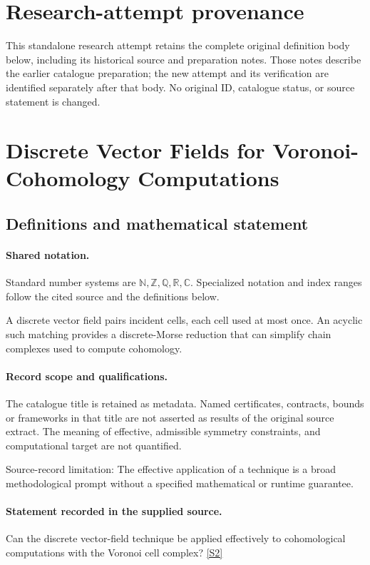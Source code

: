 \documentclass[11pt]{article}
\begin{document}
\section*{Research-attempt provenance}
This standalone research attempt retains the complete original definition body below,
including its historical source and preparation notes. Those notes describe the
earlier catalogue preparation; the new attempt and its verification are identified
separately after that body. No original ID, catalogue status, or source statement is changed.

\section{Discrete Vector Fields for Voronoi-Cohomology Computations}\label{statement}

\subsection{Definitions and mathematical statement}

\paragraph{Shared notation.}Standard number systems are $\mathbb N,\mathbb Z,\mathbb Q,\mathbb R,\mathbb C$. Specialized notation and index ranges follow the cited source and the definitions below.


A discrete vector field pairs incident cells, each cell used at most once. An acyclic such matching provides a discrete-Morse reduction that can simplify chain complexes used to compute cohomology.
\paragraph{Record scope and qualifications.}
The catalogue title is retained as metadata. Named certificates, contracts, bounds or frameworks in that title are not asserted as results of the original source extract.
The meaning of effective, admissible symmetry constraints, and computational target are not quantified.

Source-record limitation: The effective application of a technique is a broad methodological prompt without a specified mathematical or runtime guarantee.
\paragraph{Statement recorded in the supplied source.}
Can the discrete vector-field technique be applied effectively to cohomological computations with the Voronoi cell complex? \href{https://doi.org/10.4171/owr/2016/52}{[S2]}
\end{document}
